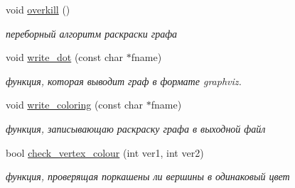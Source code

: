 \begin{DoxyCompactItemize}
void \mbox{\hyperlink{class_graph_abb07f9a9f1852e996b388160481f975c}{overkill}} ()
\begin{DoxyCompactList}\small\item\em переборный алгоритм раскраски графа \end{DoxyCompactList}\item 
void \mbox{\hyperlink{class_graph_a87b848e97501e9ed30f1ed0a457c9185}{write\+\_\+dot}} (const char $\ast$fname)
\begin{DoxyCompactList}\small\item\em функция, которая выводит граф в формате graphviz. \end{DoxyCompactList}\item 
void \mbox{\hyperlink{class_graph_a9b17ebc5472c5813dcef163e983a3a70}{write\+\_\+coloring}} (const char $\ast$fname)
\begin{DoxyCompactList}\small\item\em функция, записывающаю раскраску графа в выходной файл \end{DoxyCompactList}\item 
bool \mbox{\hyperlink{class_graph_a6e7e592ff1b087e344eb37cdc8b65e00}{check\+\_\+vertex\+\_\+colour}} (int ver1, int ver2)
\begin{DoxyCompactList}\small\item\em функция, проверящая поркашены ли вершины в одинаковый цвет \end{DoxyCompactList}\end{DoxyCompactItemize}
